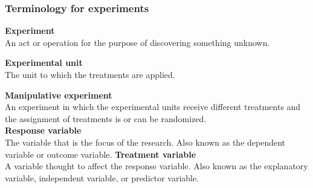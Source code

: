 \documentclass[color=usenames,dvipsnames]{beamer}\usepackage[]{graphicx}\usepackage[]{xcolor}
\begin{document}



\begin{frame}
  \frametitle{Terminology for experiments}
  \small
  {\bf Experiment} \\
  An act or operation for the purpose of discovering something
  unknown. \par
  \pause
  \vfill %
  {\bf Experimental unit} \\
  The unit to which the treatments are applied. \par
  \pause
  \vfill %
  {\bf Manipulative experiment} \\
  An experiment in which the experimental units receive different
  treatments and the assignment of treatments is or can be randomized. \\
  \pause
  \vfill
  {\bf Response variable } \\
  The variable that is the focus of the research. Also known as the
  dependent variable or outcome variable.
  \pause
  \vfill
  {\bf Treatment variable } \\
  A variable thought to affect the response variable. Also known as the 
  explanatory variable, independent variable, or predictor variable.
\end{frame}
\end{document}

